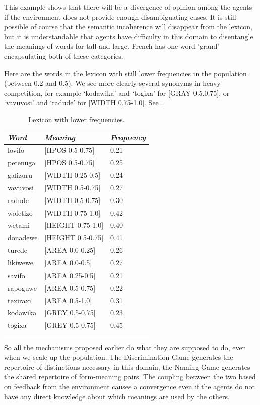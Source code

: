 This example shows that there will be a divergence of 
opinion among the agents if the environment does not 
provide enough 
disambiguating cases. It is still possible of course that 
the semantic incoherence will disappear from the lexicon, 
but it is understandable that agents have difficulty 
in this domain to disentangle the meanings of words for 
tall and large. French has one word `grand' encapsulating
both of these categories.

Here are the words in the lexicon with still lower 
frequencies in the population (between 0.2 and 0.5). We see
more clearly several synonyms in heavy competition, for example 
`kodawika' and `togixa' for [GRAY 0.5.0.75], or 
`vavuvosi' and `radude' for [WIDTH 0.75-1.0]. See . 


\begin{table}
\begin{center}
\begin{tabular}{ l  l  l }
\lsptoprule
{\itshape Word}&{\itshape Meaning} & {\itshape Frequency} \\ \midrule
lovifo & [HPOS 0.5-0.75] & 0.21 \\ 
petenuga & [HPOS 0.5-0.75] & 0.25 \\ 
gafizuru & [WIDTH 0.25-0.5] & 0.24 \\ 
vavuvosi & [WIDTH 0.5-0.75] & 0.27 \\ 
radude & [WIDTH 0.5-0.75] & 0.30 \\ 
wofetizo & [WIDTH 0.75-1.0] & 0.42 \\ 
wetami & [HEIGHT 0.75-1.0] & 0.40 \\ 
donadewe & [HEIGHT 0.5-0.75] & 0.41 \\ 
turede & [AREA 0.0-0.25] & 0.26 \\ 
likiwewe & [AREA 0.0-0.5] & 0.27 \\ 
savifo & [AREA 0.25-0.5] & 0.21 \\ 
rapoguwe & [AREA 0.5-0.75] & 0.22 \\ 
texiraxi & [AREA 0.5-1.0] & 0.31 \\ 
kodawika & [GREY 0.5-0.75] & 0.23 \\ 
togixa & [GREY 0.5-0.75] & 0.45 \\ 
\lspbottomrule
\end{tabular}
\caption{\label{tab:comp} Lexicon with lower frequencies.}
\end{center}
\end{table}

So all the mechanisms proposed earlier 
do what they are supposed to do, even when we 
scale up the population. The Discrimination 
Game generates the repertoire of distinctions 
necessary in this domain, the Naming Game generates
the shared repertoire of form-meaning pairs. The 
coupling between the two based on feedback from 
the environment causes a convergence even if the
agents do not have any direct knowledge about 
which meanings are used by the others. 

